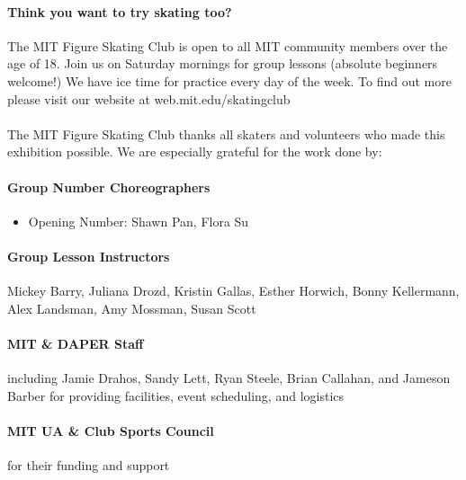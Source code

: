 \documentclass[12pt]{article}
\begin{document}
\begin{multicols*}{2}


\paragraph{Think you want to try skating too?} The MIT Figure Skating Club is open to all MIT community members over the age of 18. Join us on Saturday mornings for group lessons (absolute beginners welcome!) We have ice time for practice every day of the week. To find out more please visit our website at web.mit.edu/skatingclub

\paragraph{} The MIT Figure Skating Club thanks all skaters and volunteers who made this exhibition possible. We are especially grateful for the work done by:

\paragraph{Group Number Choreographers}
\begin{itemize}
    \item Opening Number: Shawn Pan, Flora Su
\end{itemize}

\paragraph{Group Lesson Instructors} Mickey Barry, Juliana Drozd, Kristin Gallas, Esther Horwich, Bonny Kellermann, Alex Landsman, Amy Mossman, Susan Scott
\paragraph{MIT \& DAPER Staff} including Jamie Drahos, Sandy Lett, Ryan Steele, Brian Callahan, and Jameson Barber for providing facilities, event scheduling, and logistics
\paragraph{MIT UA \& Club Sports Council} for their funding and support

\vfill\null
\columnbreak


\begin{center}


\end{center}
\end{multicols*}
\end{document}

